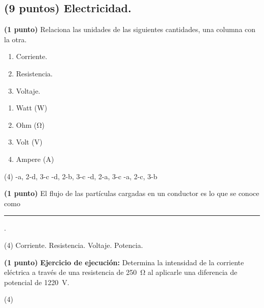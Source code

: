 \documentclass[12pt, letter]{exam}
\begin{document}


\newpage

\begin{questions}
    
    \section{(9 puntos) Electricidad.}

    \question \textbf{(1 punto)} Relaciona las unidades de las siguientes cantidades, una columna con la otra.
    \\
    \begin{minipage}[t]{0.4\linewidth}
        \begin{enumerate}[label=\arabic*)]
            \item Corriente.
            \item Resistencia.
            \item Voltaje.
        \end{enumerate}
    \end{minipage}
    \begin{minipage}[t]{0.4\linewidth}
        \begin{enumerate}[label=\alph*)]
            \item Watt (\si{\watt})
            \item Ohm (\si{\ohm})
            \item Volt (\si{\volt})
            \item Ampere (\si{\ampere})
        \end{enumerate}
    \end{minipage}
    \begin{tasks}(4)
        -a, 2-d, 3-c
        -d, 2-b, 3-c
        -d, 2-a, 3-c
        -a, 2-c, 3-b
    \end{tasks}
    \question \textbf{(1 punto)} El flujo de las partículas cargadas en un conductor es lo que se conoce como \rule{2cm}{0.1mm}.
    \begin{tasks}(4)
        \task Corriente.
        \task Resistencia.
        \task Voltaje.
        \task Potencia.
    \end{tasks}
    \question \textbf{(1 punto)} \label{Problema_01} \textbf{Ejercicio de ejecución: } Determina la intensidad de la corriente eléctrica a través de una resistencia de \SI{250}{\ohm} al aplicarle una diferencia de potencial de \SI{1220}{\volt}.
    \begin{tasks}(4)

\end{tasks}
\end{questions}
\end{document}
